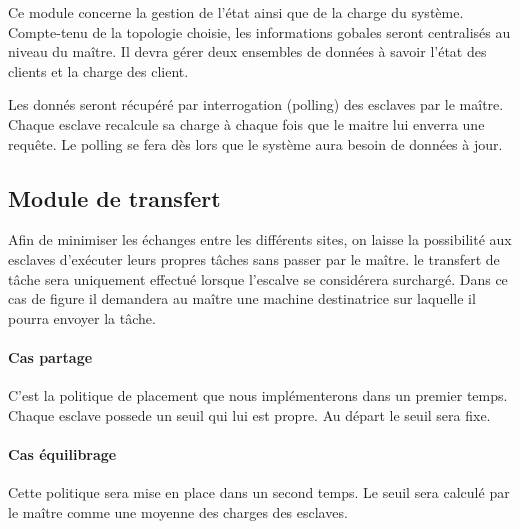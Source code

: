       Ce module concerne la gestion de l'état ainsi que de la charge
      du système. Compte-tenu de la topologie choisie, les
      informations gobales seront centralisés au niveau du maître. Il
      devra gérer deux ensembles de données à savoir l'état des
      clients et la charge des client.
        
      Les donnés seront récupéré par interrogation (polling) des
      esclaves par le maître. Chaque esclave recalcule sa charge à
      chaque fois que le maitre lui enverra une requête. Le polling se
      fera dès lors que le système aura besoin de données à jour.


    \subsection{Module de transfert}

      Afin de minimiser les échanges entre les différents sites, on
      laisse la possibilité aux esclaves d'exécuter leurs propres
      tâches sans passer par le maître. le transfert de tâche sera
      uniquement effectué lorsque l'escalve se considérera surchargé.
      Dans ce cas de figure il demandera au maître une machine
      destinatrice sur laquelle il pourra envoyer la tâche.
        
      \paragraph{Cas partage} C'est la politique de placement que nous
        implémenterons dans un premier temps. Chaque esclave possede
        un seuil qui lui est propre. Au départ le seuil sera fixe.
      
      \paragraph{Cas équilibrage} Cette politique sera mise en place
        dans un second temps. Le seuil sera calculé par le maître
        comme une moyenne des charges des esclaves.

